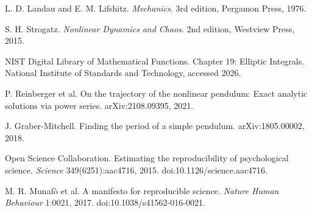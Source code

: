  L. D. Landau and E. M. Lifshitz. \emph{Mechanics}. 3rd edition, Pergamon Press, 1976.

 S. H. Strogatz. \emph{Nonlinear Dynamics and Chaos}. 2nd edition, Westview Press, 2015.

 NIST Digital Library of Mathematical Functions. Chapter 19: Elliptic Integrals. National Institute of Standards and Technology, accessed 2026.

 P. Reinberger et al. On the trajectory of the nonlinear pendulum: Exact analytic solutions via power series. arXiv:2108.09395, 2021.

 J. Graber-Mitchell. Finding the period of a simple pendulum. arXiv:1805.00002, 2018.

 Open Science Collaboration. Estimating the reproducibility of psychological science. \emph{Science} 349(6251):aac4716, 2015. doi:10.1126/science.aac4716.

 M. R. Munaf\`o et al. A manifesto for reproducible science. \emph{Nature Human Behaviour} 1:0021, 2017. doi:10.1038/s41562-016-0021.
